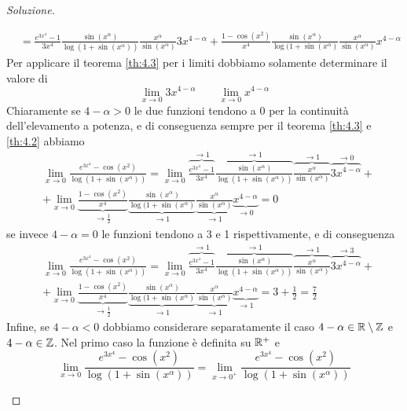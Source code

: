 \begin{proof}[Soluzione]
\begin{enumerate}[(i)]
\[\begin{split}
            & = \frac{e^{3x^4}-1}{3x^4}\frac{\sin(x^\alpha)}{\log(1+\sin(x^\alpha))}\frac{x^\alpha}{\sin(x^\alpha)}3x^{4-\alpha}+\frac{1-\cos(x^2)}{x^4}\frac{\sin(x^\alpha)}{\log(1+\sin(x^\alpha)}\frac{x^\alpha}{\sin(x^\alpha)}x^{4-\alpha}
        \end{split}
        \]
        Per applicare il teorema \ref{th:4.3} per i limiti dobbiamo solamente determinare il valore di
        \[
        \lim_{x\to 0} 3x^{4-\alpha} \qquad \lim_{x\to 0} x^{4-\alpha}
        \]
        Chiaramente se $4-\alpha>0$ le due funzioni tendono a 0 per la continuità dell'elevamento a potenza, e di conseguenza sempre per il teorema \ref{th:4.3} e \ref{th:4.2} abbiamo
        \[
        \begin{split}
            &\lim_{x\to 0} \frac{e^{3x^4}-\cos(x^2)}{\log(1+\sin(x^\alpha))} = \lim_{x\to 0} \overbrace{\frac{e^{3x^4}-1}{3x^4}}^{\to 1}\overbrace{\frac{\sin(x^\alpha)}{\log(1+\sin(x^\alpha))}}^{\to 1}\overbrace{\frac{x^\alpha}{\sin(x^\alpha)}}^{\to 1} \overbrace{3x^{4-\alpha}}^{\to 0} + \\
            & + \lim_{x\to 0}\underbrace{ \frac{1-\cos(x^2)}{x^4}}_{\to \frac{1}{2}}\underbrace{\frac{\sin(x^\alpha)}{\log(1+\sin(x^\alpha)}}_{\to1}\underbrace{\frac{x^\alpha}{\sin(x^\alpha)}}_{\to 1}\underbrace{x^{4-\alpha}}_{\to 0} = 0
        \end{split}
        \]
        se invece $4-\alpha=0$ le funzioni tendono a 3 e 1 rispettivamente, e di conseguenza
        \[
        \begin{split}
            &\lim_{x\to 0} \frac{e^{3x^4}-\cos(x^2)}{\log(1+\sin(x^\alpha))} = \lim_{x\to 0} \overbrace{\frac{e^{3x^4}-1}{3x^4}}^{\to 1}\overbrace{\frac{\sin(x^\alpha)}{\log(1+\sin(x^\alpha))}}^{\to 1}\overbrace{\frac{x^\alpha}{\sin(x^\alpha)}}^{\to 1} \overbrace{3x^{4-\alpha}}^{\to 3} + \\
            & + \lim_{x\to 0}\underbrace{ \frac{1-\cos(x^2)}{x^4}}_{\to \frac{1}{2}}\underbrace{\frac{\sin(x^\alpha)}{\log(1+\sin(x^\alpha)}}_{\to1}\underbrace{\frac{x^\alpha}{\sin(x^\alpha)}}_{\to 1}\underbrace{x^{4-\alpha}}_{\to 1} = 3 + \frac{1}{2} = \frac{7}{2}
        \end{split}
        \]
        Infine, se $4-\alpha<0$ dobbiamo considerare separatamente il caso $4-\alpha\in\amsbb{R}\setminus \amsbb{Z}$ e $4-\alpha\in \amsbb{Z}$. Nel primo caso la funzione è definita su $\amsbb{R}^+$ e
        \[
        \lim_{x\to 0} \frac{e^{3x^4}-\cos(x^2)}{\log(1+\sin(x^\alpha))} = \lim_{x\to 0^+}\frac{e^{3x^4}-\cos(x^2)}{\log(1+\sin(x^\alpha))}
        \]

\end{enumerate}
\end{proof}
